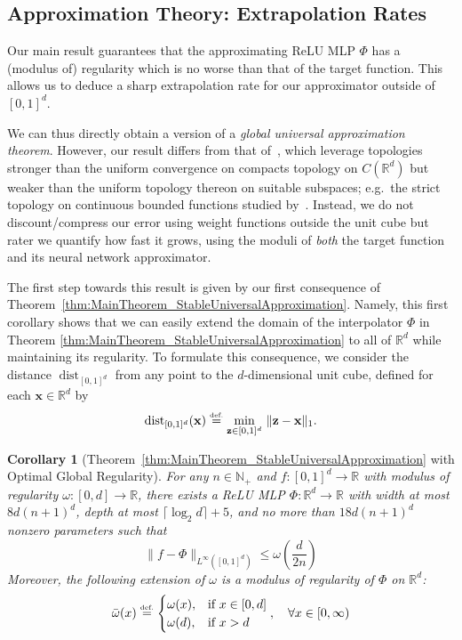 \documentclass{article}
\numberwithin{equation}{section}
\newtheorem{corollary}{Corollary}[section]
\theoremstyle{definition}
\newcommand{\eqdef}{\ensuremath{\stackrel{\mbox{\upshape\tiny def.}}{=}}}
\begin{document}
\subsection{Approximation Theory: Extrapolation Rates}
\label{s:Main__ss:Consequences___Extrapolation}
Our main result guarantees that the approximating ReLU MLP $\Phi$ has a (modulus of) regularity which is no worse than that of the target function.  This allows us to deduce a sharp extrapolation rate for our approximator outside of $[0,1]^d$.  


We can thus directly obtain a version of a \textit{global universal approximation theorem}.  However, our result differs from that of~\cite{cuchiero2023global}, which leverage topologies stronger than the uniform convergence on compacts topology on $C(\mathbb{R}^d)$ but weaker than the uniform topology thereon on suitable subspaces; e.g.\ the strict topology on continuous bounded functions studied by~\cite{ToddStoneWeirestrassStricTop_1965,giles1971generalization,Timofte2Khan_SWExtNLC_2018}.  Instead, we do not discount/compress our error using weight functions outside the unit cube but rater we quantify how fast it grows, using the moduli of \textit{both} the target function and its neural network approximator.  

The first step towards this result is given by our first consequence of Theorem~\ref{thm:MainTheorem_StableUniversalApproximation}.  Namely, this first corollary shows that we can easily extend the domain of the interpolator $\Phi$ in Theorem \ref{thm:MainTheorem_StableUniversalApproximation} to all of $\mathbb{R}^d$ while maintaining its regularity.
To formulate this consequence, we consider the distance $\operatorname{dist}_{[0,1]^d}$ from any point to the $d$-dimensional unit cube, defined for each $\mathbf{x}\in \mathbb{R}^d$ by
\[
    \operatorname{dist}_{[0,1]^d}(\mathbf{x})\eqdef \min_{\mathbf{z}\in 
        [0,1]^d
    }\, 
        \|\mathbf{z}-\mathbf{x}\|_1
.
\]

\begin{corollary}[Theorem~\ref{thm:MainTheorem_StableUniversalApproximation} with Optimal Global Regularity]
\label{cor:main_StableUniversalApproximation___with_OptimalLipschitzExtrapolation}
    For any $n\in\mathbb{N}_+$ and $f:[0,1]^d \rightarrow\mathbb{R}$ with modulus of regularity $\omega:[0,d] \rightarrow\mathbb{R}$, there exists a ReLU MLP $\Phi: \mathbb{R}^d \rightarrow \mathbb{R}$ with width at most $8d(n+1)^d$, depth at most $\lceil \log_2{d} \rceil + 5$, and no more than $18d(n+1)^d$ nonzero parameters such that 
    \[
        \|f-\Phi\|_{L^{\infty}([0,1]^d)} 
        \le 
        \omega\left(\frac{d}{2n}\right)
    \]
    Moreover, the following extension of $\omega$ is a modulus of regularity of $\Phi$ on $\mathbb{R}^d$:
    \begin{equation}
    \label{eq:omega_ext}
        \bar{\omega}(x) \eqdef
        \begin{cases}
            \omega(x), & \text{if } x\in[0,d]  \\
            \omega(d), & \text{if } x > d 
        \end{cases},
        \quad \forall x\in[0,\infty)
    \end{equation}
\end{corollary}
\end{document}
